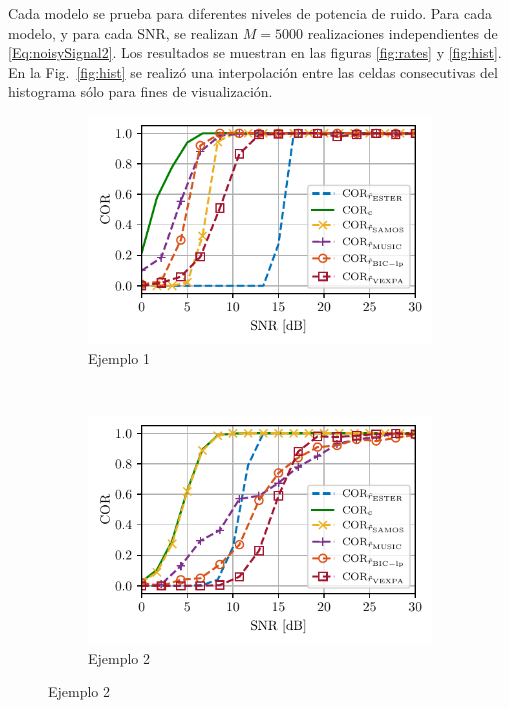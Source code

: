 Cada  modelo se prueba para diferentes niveles de potencia de ruido. Para cada modelo, y para cada SNR, se realizan $M=5000$ realizaciones independientes de \eqref{Eq:noisySignal2}. Los resultados se muestran en las figuras \ref{fig:rates} y \ref{fig:hist}. En la Fig.~\ref{fig:hist} se realizó una interpolación entre las celdas consecutivas del histograma sólo para fines de visualización. 

\begin{figure}[t]
	\begin{subfigure}[b]{0.5\linewidth}
		\includegraphics[width = \linewidth]{Figuras/COR_example_1_vexpa.pdf}
		\caption{Ejemplo 1}
	\end{subfigure}
	~
	\begin{subfigure}[b]{0.5\linewidth}
		\includegraphics[width = \linewidth]{Figuras/COR_example_2_vexpa.pdf}
		\caption{Ejemplo 2}
	\end{subfigure}

\end{figure}
